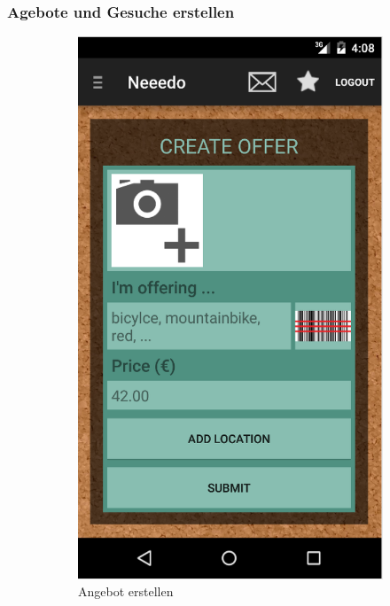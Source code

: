 \subsubsection{Agebote und Gesuche erstellen }
\begin{figure}[H]
\begin{subfigure}{0.5\textwidth}
\includegraphics[width=0.9\linewidth]{./Bilder/createOffer.png} 
\caption{Angebot erstellen}
\label{fig:offer}
\end{subfigure}
\begin{subfigure}{0.5\textwidth}

\end{subfigure}
\end{figure}
